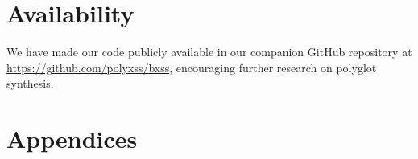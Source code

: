 \documentclass[letterpaper, twocolumn, 10pt]{article}
\begin{document}
\section*{Availability}\label{sec:availability}


We have made our code publicly available in our companion GitHub repository at \url{https://github.com/polyxss/bxss}, encouraging further research on polyglot synthesis.

{%
\footnotesize
\def\UrlBreaks{\do\/\do-\do.\do\#}

}

\appendix%
\section*{Appendices}

\renewcommand{\thesubsection}{\Alph{subsection}}


\end{document}

